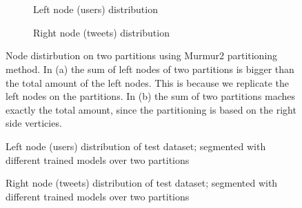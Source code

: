 \chapter{\appendixname}

\begin{figure}[!htb]
    \centering
	\begin{subfigure}{\textwidth}
		\centering
		
		\caption{Left node (users) distribution}
		\label{plot:left-node-distribution-murmur2}
    \end{subfigure}\qquad

    \begin{subfigure}{\textwidth}
		\centering
		
		\caption{Right node (tweets) distribution}
		\label{plot:right-node-distribution-murmur2}
    \end{subfigure}\qquad
    
    \caption{Node distirbution on two partitions using Murmur2 partitioning method. In (a) the sum of left nodes of two partitions is bigger than the total amount of the left nodes. This is because we replicate the left nodes on the partitions. In (b) the sum of two partitions maches exactly the total amount, since the partitioning is based on the right side verticies.}
\end{figure}


\begin{figure}[!htb]
	\centering
	
	\caption{Left node (users) distribution of test dataset; segmented with different trained models over two partitions}
	\label{plot:left-node-distribution}
\end{figure}

\begin{figure}[!htb]
	\centering
	
	\caption{Right node (tweets) distribution of test dataset; segmented with different trained models over two partitions}
	\label{plot:right-node-distribution}
\end{figure}


